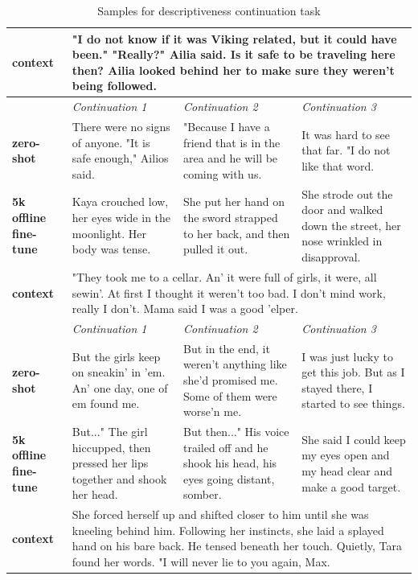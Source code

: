 
\begin{table}[t]
\begin{center}
\caption*{Samples for descriptiveness continuation task}
\begin{tabular}{|p{2cm}|p{4cm}|p{4cm}|p{4cm}|}

\hline
    
\hline
\textbf{context}
&
\multicolumn{3}{|C{12cm}|}{ 
"I do not know if it was Viking related, but it could have been."
\newline
"Really?" Ailia said. Is it safe to be traveling here then?  Ailia looked behind her to make sure they weren't being followed.
}
\\
\hline
&
\textit{Continuation 1}
&
\textit{Continuation 2}
&
\textit{Continuation 3}
\\
\hline
\textbf{zero-shot}
&
There were no signs of anyone. 
\newline
"It is safe enough," Ailios said.
&
"Because I have a friend that is in the area and he will be coming with us.
&
It was hard to see that far.  "I do not like that word.
\\
\hline
\textbf{5k offline fine-tune}
&
Kaya crouched low, her eyes wide in the moonlight. Her body was tense.
&
She put her hand on the sword strapped to her back, and then pulled it out.
&
She strode out the door and walked down the street, her nose wrinkled in disapproval.
\\
\hline
\hline
\textbf{context}
&
\multicolumn{3}{|C{12cm}|}{ 
"They took me to a cellar. An' it were full of girls, it were, all sewin'. At first I thought it weren't too bad. I don't mind work, really I don't. Mama said I was a good 'elper.
}
\\
\hline
&
\textit{Continuation 1}
&
\textit{Continuation 2}
&
\textit{Continuation 3}
\\
\hline
\textbf{zero-shot}
&
But the girls keep on sneakin' in 'em. An' one day, one of em found me.
&
But in the end, it weren't anything like she'd promised me. Some of them were worse'n me.
&
I was just lucky to get this job. But as I stayed there, I started to see things.
\\
\hline
\textbf{5k offline fine-tune}
&
But..." The girl hiccupped, then pressed her lips together and shook her head.
&
But then..." His voice trailed off and he shook his head, his eyes going distant, somber.
&
She said I could keep my eyes open and my head clear and make a good target.
\\
\hline
\hline
\textbf{context}
&
\multicolumn{3}{|C{12cm}|}{ 
She forced herself up and shifted closer to him until she was kneeling behind him. Following her instincts, she laid a splayed hand on his bare back. He tensed beneath her touch. Quietly, Tara found her words. "I will never lie to you again, Max.
}
\end{tabular}
\end{center}
\end{table}
